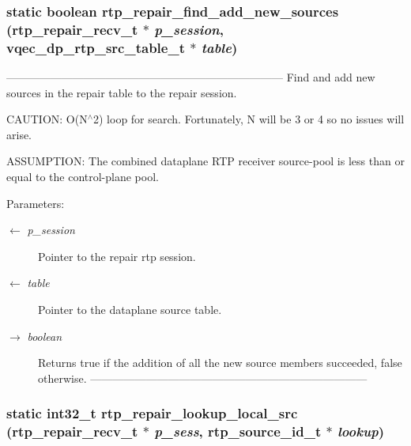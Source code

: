 \subsubsection{\setlength{\rightskip}{0pt plus 5cm}static boolean rtp\_\-repair\_\-find\_\-add\_\-new\_\-sources (\bf{rtp\_\-repair\_\-recv\_\-t} $\ast$ {\em p\_\-session}, vqec\_\-dp\_\-rtp\_\-src\_\-table\_\-t $\ast$ {\em table})\hspace{0.3cm}{\tt  [static]}}\label{rtp__repair__recv_8c_4059b9b903c3849fbfc1c125fe6397b6}


--------------------------------------------------------------------------- Find and add new sources in the repair table to the repair session.

CAUTION: O(N$^\wedge$2) loop for search. Fortunately, N will be 3 or 4 so no issues will arise.

ASSUMPTION: The combined dataplane RTP receiver source-pool is less than or equal to the control-plane pool.

\begin{Desc}
\item[Parameters:]
\begin{description}
\item[\mbox{$\leftarrow$} {\em p\_\-session}]Pointer to the repair rtp session. \item[\mbox{$\leftarrow$} {\em table}]Pointer to the dataplane source table. \item[\mbox{$\rightarrow$} {\em boolean}]Returns true if the addition of all the new source members succeeded, false otherwise. --------------------------------------------------------------------------- \end{description}
\end{Desc}
\subsubsection{\setlength{\rightskip}{0pt plus 5cm}static int32\_\-t rtp\_\-repair\_\-lookup\_\-local\_\-src (\bf{rtp\_\-repair\_\-recv\_\-t} $\ast$ {\em p\_\-sess}, rtp\_\-source\_\-id\_\-t $\ast$ {\em lookup})\hspace{0.3cm}{\tt  [static]}}\label{rtp__repair__recv_8c_e7af10f296671a604fea79f4ca1aa06c}


